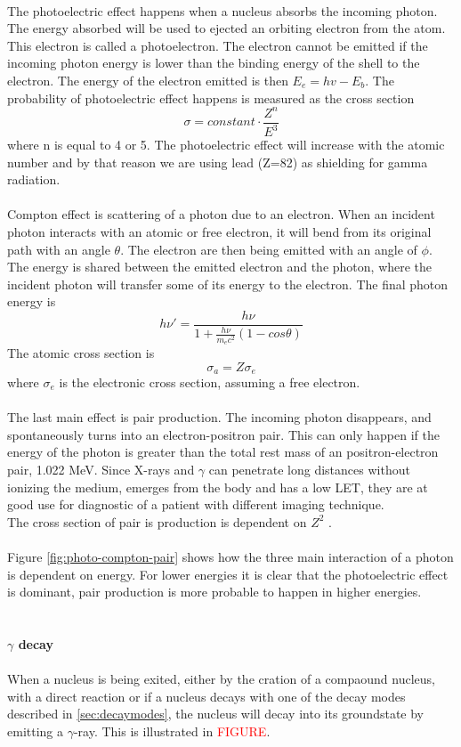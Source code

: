 \documentclass[twoside,english]{uiofysmaster/uiofysmaster}
\begin{document}
\\
The photoelectric effect happens when a nucleus absorbs the incoming photon. The energy absorbed will be used to ejected an orbiting electron from the atom. This electron is called a photoelectron\cite{nuclearchem}. The electron cannot be emitted if the incoming photon energy is lower than the binding energy of the shell to the electron. The energy of the electron emitted is then $E_e = hv - E_b$. The probability of photoelectric effect happens is measured as the cross section 
$$\sigma = constant \cdot \frac{Z^n}{E^3}$$
where n is equal to 4 or 5\cite{Radiological_physics}. The photoelectric effect will increase with the atomic number and by that reason we are using lead (Z=82) as shielding for gamma radiation.\\ 
\\
Compton effect is scattering of a photon due to an electron. When an incident photon interacts with an atomic or free electron, it will bend from its original path with an angle $\theta$. The electron are then being emitted with an angle of $\phi$.\\
The energy is shared between the emitted electron and the photon, where the incident photon will transfer some of its energy to the electron. The final photon energy is $$h\nu' = \frac{h\nu}{1 + \frac{h\nu}{m_ec^2} (1-cos\theta)}$$
The atomic cross section is $$\sigma_a = Z \sigma_e$$ where $\sigma_e$ is the electronic cross section, assuming a free electron\cite{nuclearchem}.\\
\\
The last main effect is pair production. The incoming photon disappears, and spontaneously turns into an electron-positron pair. This can only happen if the energy of the photon is greater than the total rest mass of an positron-electron pair, 1.022 MeV. Since X-rays and $\gamma$ can penetrate long distances without ionizing the medium, emerges from the body and has a low LET, they are at good use for diagnostic of a patient with different imaging technique. \\
The cross section of pair is production is dependent on $Z^2$ .
\\
\\
Figure \ref{fig:photo-compton-pair} shows how the three main interaction of a photon is dependent on energy. For lower energies it is clear that the photoelectric effect is dominant, pair production is more probable to happen in higher energies.\\
\\
\\
\textbf{$\gamma$ decay}
\\
\\
When a nucleus is being exited, either by the cration of a compaound nucleus, with a direct reaction or if a nucleus decays with one of the decay modes described in \ref{sec:decaymodes}, the nucleus will decay into its groundstate by emitting a $\gamma$-ray. This is illustrated in \textcolor{red}{FIGURE}. 
\\
\\
\end{document}
